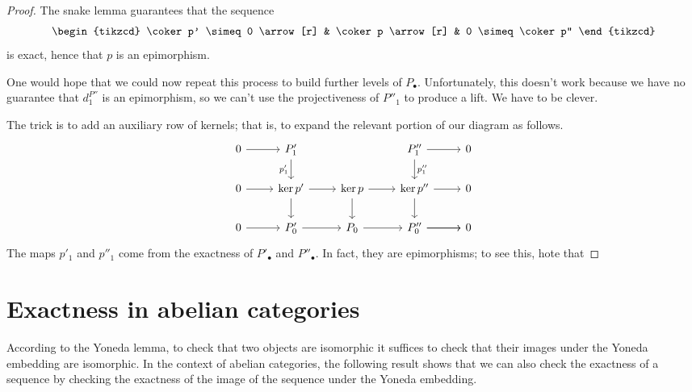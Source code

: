 \documentclass[main.tex]{subfiles}
\begin{document}
\begin{proof}
  The snake lemma guarantees that the sequence
  \begin{equation*}
    \begin{tikzcd}
      \coker p' \simeq 0
      \arrow[r]
      & \coker p
      \arrow[r]
      & 0 \simeq \coker p''
    \end{tikzcd}
  \end{equation*}
  is exact, hence that $p$ is an epimorphism.

  One would hope that we could now repeat this process to build further levels of $P_{\bullet}$. Unfortunately, this doesn't work because we have no guarantee that $d^{P''}_{1}$ is an epimorphism, so we can't use the projectiveness of $P''_{1}$ to produce a lift. We have to be clever.

  The trick is to add an auxiliary row of kernels; that is, to expand the relevant portion of our diagram as follows.
  \begin{equation*}
    \begin{tikzcd}
      0
      \arrow[r]
      & P'_{1}
      \arrow[d, swap, "p_{1}'"]
      && P''_{1}
      \arrow[r]
      \arrow[d, "p_{1}''"]
      & 0
      \\
      0
      \arrow[r]
      & \ker p'
      \arrow[r]
      \arrow[d]
      & \ker p
      \arrow[r]
      \arrow[d]
      & \ker p''
      \arrow[r]
      \arrow[d]
      & 0
      \\
      0
      \arrow[r]
      & P'_{0}
      \arrow[r]
      & P_{0}
      \arrow[r]
      & P''_{0}
      \arrow[r]
      \arrow[r]
      & 0
    \end{tikzcd}
  \end{equation*}
  The maps $p'_{1}$ and $p''_{1}$ come from the exactness of $P'_{\bullet}$ and $P''_{\bullet}$. In fact, they are epimorphisms; to see this, hote that
\end{proof}

\section{Exactness in abelian categories}
\label{sss:exactness_in_abelian_categories}

According to the Yoneda lemma, to check that two objects are isomorphic it suffices to check that their images under the Yoneda embedding are isomorphic. In the context of abelian categories, the following result shows that we can also check the exactness of a sequence by checking the exactness of the image of the sequence under the Yoneda embedding.
\end{document}
